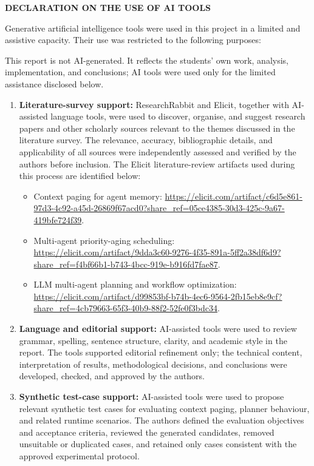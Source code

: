 \begin{center}\large\bfseries DECLARATION ON THE USE OF AI TOOLS\end{center}

Generative artificial intelligence tools were used in this project in a limited and assistive capacity. Their use was restricted to the following purposes:

This report is not AI-generated. It reflects the students' own work, analysis, implementation, and conclusions; AI tools were used only for the limited assistance disclosed below.

\begin{enumerate}
\item \textbf{Literature-survey support:} ResearchRabbit and Elicit, together with AI-assisted language tools, were used to discover, organise, and suggest research papers and other scholarly sources relevant to the themes discussed in the literature survey. The relevance, accuracy, bibliographic details, and applicability of all sources were independently assessed and verified by the authors before inclusion. The Elicit literature-review artifacts used during this process are identified below:
\begin{itemize}
\raggedright
\item Context paging for agent memory: \url{https://elicit.com/artifact/c6d5e861-97d3-4c92-a45d-26869f67acd0?share_ref=05ce4385-30d3-425c-9a67-419bfe724f39}.
\item Multi-agent priority-aging scheduling: \url{https://elicit.com/artifact/9dda3c60-9276-4f35-891a-5ff2a38df6d9?share_ref=f4bf66b1-b743-4bcc-919e-b916fd7fae87}.
\item LLM multi-agent planning and workflow optimization: \url{https://elicit.com/artifact/d99853bf-b74b-4ec6-9564-2fb15eb8e9cf?share_ref=4cb79663-65f3-40b9-88f2-52fe0f3bdc34}.
\end{itemize}
\item \textbf{Language and editorial support:} AI-assisted tools were used to review grammar, spelling, sentence structure, clarity, and academic style in the report. The tools supported editorial refinement only; the technical content, interpretation of results, methodological decisions, and conclusions were developed, checked, and approved by the authors.
\item \textbf{Synthetic test-case support:} AI-assisted tools were used to propose relevant synthetic test cases for evaluating context paging, planner behaviour, and related runtime scenarios. The authors defined the evaluation objectives and acceptance criteria, reviewed the generated candidates, removed unsuitable or duplicated cases, and retained only cases consistent with the approved experimental protocol.
\end{enumerate}

